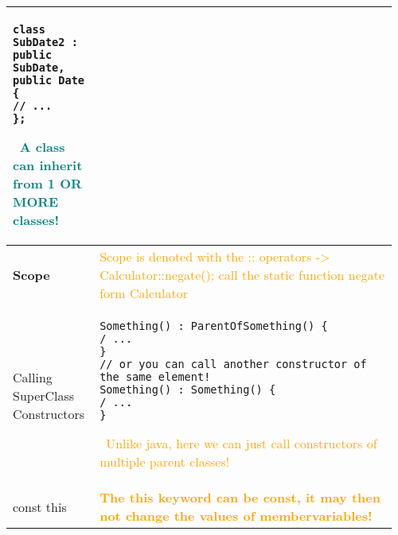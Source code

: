 \documentclass[main.tex,fontsize=8pt,paper=a4,paper=portrait,DIV=calc,]{scrartcl}
\begin{document}
\begin{table}[ht!]
\begin{tabular}{|m{0.2\linewidth}|m{0.755\linewidth}|}
\begin{lstlisting}
class SubDate2 : public SubDate, public Date {
// ...
};
\end{lstlisting}
\, \newline
\textcolor{teal}{A class can inherit from 1 \textbf{OR MORE} classes!}\\
\hline
\textbf{Scope} & 
\textcolor{orange}{Scope is denoted with the :: operators -> Calculator::negate(); \newline call the static function negate form Calculator}\\
\hline
Calling SuperClass Constructors & 
\begin{lstlisting}
Something() : ParentOfSomething() {
/ ...
}
// or you can call another constructor of the same element!
Something() : Something() {
/ ...
}
\end{lstlisting}
\, \newline
\textcolor{orange}{Unlike java, here we can just call constructors of multiple parent classes!}\\
\hline
const this & 
\textcolor{orange}{\textbf{The this keyword can be const, it may then not change the values of membervariables!}}\\
\hline 
\end{tabular}
\end{table}
\pagebreak
\end{document}
